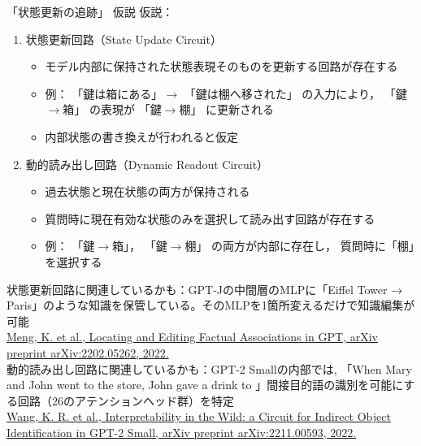 \documentclass[aspectratio=43,xcolor=dvipsnames]{beamer}
\begin{document}
\begin{frame}{「状態更新の追跡」 仮説}
    仮説：
    \begin{enumerate}\scriptsize
        \item 状態更新回路（State Update Circuit）
        \begin{itemize}\scriptsize
            \item モデル内部に保持された状態表現そのものを更新する回路が存在する
            \item 例：
            「鍵は箱にある」$\rightarrow$
            「鍵は棚へ移された」
            の入力により，
            「鍵$\rightarrow$箱」
            の表現が
            「鍵$\rightarrow$棚」
            に更新される
            \item 内部状態の書き換えが行われると仮定
        \end{itemize}
        \vspace{0.3em}
        \item 動的読み出し回路（Dynamic Readout Circuit）
        \begin{itemize}\scriptsize
            \item 過去状態と現在状態の両方が保持される
            \item 質問時に現在有効な状態のみを選択して読み出す回路が存在する
            \item 例：
            「鍵$\rightarrow$箱」，
            「鍵$\rightarrow$棚」
            の両方が内部に存在し，
            質問時に「棚」を選択する
        \end{itemize}
    \end{enumerate}
    \vspace{0.5em}
    \tiny
    状態更新回路に関連しているかも：GPT-Jの中間層のMLPに「Eiffel Tower → Paris」のような知識を保管している。そのMLPを1箇所変えるだけで知識編集が可能\\
    \href{https://arxiv.org/abs/2202.05262}
    {Meng, K. et al., Locating and Editing Factual Associations in GPT, arXiv preprint arXiv:2202.05262, 2022.}\\
    \vspace{1em}
    動的読み出し回路に関連しているかも：GPT-2 Smallの内部では, 「When Mary and John went to the store, John gave a drink to 」間接目的語の識別を可能にする回路（26のアテンションヘッド群）を特定\\
    \href{https://arxiv.org/abs/2211.00593}
    {Wang, K. R. et al., Interpretability in the Wild: a Circuit for Indirect Object Identification in GPT-2 Small, arXiv preprint arXiv:2211.00593, 2022.}
\end{frame}
\end{document}

